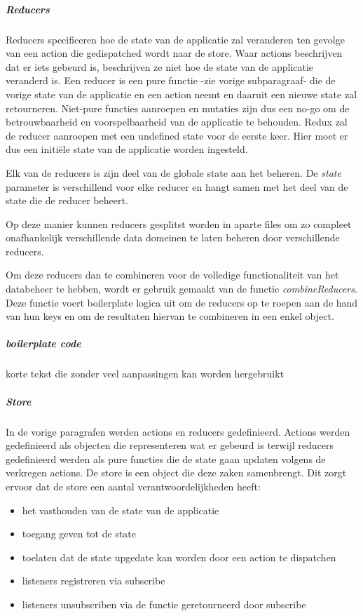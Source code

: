 \subparagraph{Reducers}
Reducers specificeren hoe de state van de applicatie zal veranderen ten gevolge van een action die gedispatched wordt naar de store. Waar actions beschrijven dat er iets gebeurd is, beschrijven ze niet hoe de state van de applicatie veranderd is. Een reducer is een pure functie -zie vorige subparagraaf- die de vorige state van de applicatie en een action neemt en daaruit een nieuwe state zal retourneren. 
Niet-pure functies aanroepen en mutaties zijn dus een no-go om de betrouwbaarheid en voorspelbaarheid van de applicatie te behouden. Redux zal de reducer aanroepen met een undefined state voor de eerste keer. Hier moet er dus een initiële state van de applicatie worden ingesteld.

Elk van de reducers is zijn deel van de globale state aan het beheren. De \textit{state} parameter is verschillend voor elke reducer en hangt samen met het deel van de state die de reducer beheert.

Op deze manier kunnen reducers gesplitst worden in aparte files om zo compleet onafhankelijk verschillende data domeinen te laten beheren door verschillende reducers. 

Om deze reducers dan te combineren voor de volledige functionaliteit van het databeheer te hebben, wordt er gebruik gemaakt van de functie \textit{combineReducers}. Deze functie voert boilerplate logica uit om de reducers op te roepen aan de hand van hun keys en om de resultaten hiervan te combineren in een enkel object. 

\subparagraph{boilerplate code}
korte tekst die zonder veel aanpassingen kan worden hergebruikt

\subparagraph{Store}
In de vorige paragrafen werden actions en reducers gedefinieerd. Actions werden gedefinieerd als objecten die representeren wat er gebeurd is terwijl reducers gedefinieerd werden als pure functies die de state gaan updaten volgens de verkregen actions. De store is een object die deze zaken samenbrengt. Dit zorgt ervoor dat de store een aantal verantwoordelijkheden heeft:

\begin{itemize}
	\item het vasthouden van de state van de applicatie
	\item toegang geven tot de state
	\item toelaten dat de state upgedate kan worden door een action te dispatchen
	\item listeners registreren via subscribe
	\item listeners unsubscriben via de functie geretourneerd door subscribe
\end{itemize}

